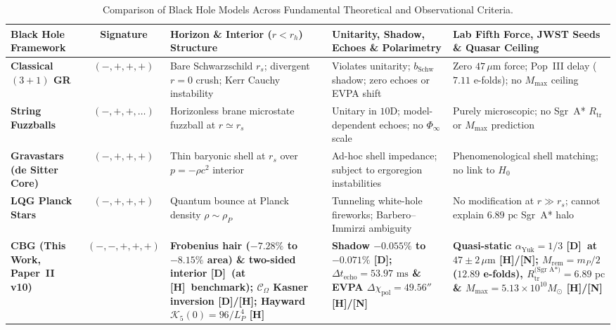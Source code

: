 \documentclass[11pt,a4paper]{article}
\newcommand{\catD}{\textbf{\textcolor{blue!75!black}{[D]}}}
\newcommand{\catH}{\textbf{\textcolor{orange!85!black}{[H]}}}
\newcommand{\catN}{\textbf{\textcolor{teal!75!black}{[N]}}}
\theoremstyle{plain}
\theoremstyle{definition}
\theoremstyle{remark}
\numberwithin{equation}{section}
\begin{document}
\begin{table}[H]
\centering
\caption{Comparison of Black Hole Models Across Fundamental Theoretical and Observational Criteria.}
\label{tab:bh_paradigms_comparison}
\vspace{0.10cm}
\footnotesize
\setlength{\tabcolsep}{3.5pt}
\renewcommand{\arraystretch}{1.24}
\begin{tabularx}{\textwidth}{@{} L{0.16\textwidth} c Y Y Y @{}}
\toprule
\textbf{Black Hole Framework} & \textbf{Signature} & \textbf{Horizon \& Interior ($r < r_h$) Structure} & \textbf{Unitarity, Shadow, Echoes \& Polarimetry} & \textbf{Lab Fifth Force, JWST Seeds \& Quasar Ceiling} \\
\midrule
\textbf{Classical $(3+1)$ GR} \cite{schwarzschild1916,kerr1963} & $(-,+,+,+)$ & Bare Schwarzschild $r_s$; divergent $r=0$ crush; Kerr Cauchy instability & Violates unitarity; $b_{\text{Schw}}$ shadow; zero echoes or EVPA shift & Zero $47\,\mu\text{m}$ force; Pop~III delay ($7.11$ e-folds); no $M_{\max}$ ceiling \\
\addlinespace[2.5pt]
\textbf{String Fuzzballs} \cite{mathur2005} & $(-,+,+,\dots)$ & Horizonless brane microstate fuzzball at $r \simeq r_s$ & Unitary in $10\text{D}$; model-dependent echoes; no $\Phi_{\infty}$ scale & Purely microscopic; no Sgr~A* $R_{\text{tr}}$ or $M_{\max}$ prediction \\
\addlinespace[2.5pt]
\textbf{Gravastars (de Sitter Core)} \cite{mazur2004} & $(-,+,+,+)$ & Thin baryonic shell at $r_s$ over $p = -\rho c^2$ interior & Ad-hoc shell impedance; subject to ergoregion instabilities & Phenomenological shell matching; no link to $H_0$ \\
\addlinespace[2.5pt]
\textbf{LQG Planck Stars} \cite{rovelli2014,ashtekar2018} & $(-,+,+,+)$ & Quantum bounce at Planck density $\rho \sim \rho_P$ & Tunneling white-hole fireworks; Barbero--Immirzi ambiguity & No modification at $r \gg r_s$; cannot explain $6.89\text{ pc}$ Sgr~A* halo \\
\addlinespace[2.5pt]
\textbf{CBG (This Work, Paper~II v10)} \cite{jimenez2026_p0,jimenez2026a} & $(-,-,+,+,+)$ & \textbf{Frobenius hair ($-7.28\%$ to $-8.15\%$ area) \& two-sided interior \catD\ (at \catH\ benchmark); $\mathcal{C}_{\Omega}$ Kasner inversion \catD/\catH; Hayward $\mathcal{K}_5(0)=96/L_P^4$ \catH} & \textbf{Shadow $-0.055\%$ to $-0.071\%$ \catD; $\Delta t_{\text{echo}} = 53.97\text{ ms}$ \& EVPA $\Delta\chi_{\text{pol}} = 49.56''$ \catH/\catN} & \textbf{Quasi-static $\alpha_{\text{Yuk}} = 1/3$ \catD\ at $47 \pm 2\,\mu\text{m}$ \catH/\catN; $M_{\text{rem}} = m_P/2$ ($12.89$ e-folds), $R_{\text{tr}}^{\text{(Sgr A*)}} = 6.89\text{ pc}$ \& $M_{\max} = 5.13\times 10^{10} M_\odot$ \catH/\catN} \\
\bottomrule
\end{tabularx}
\end{table}
\end{document}
